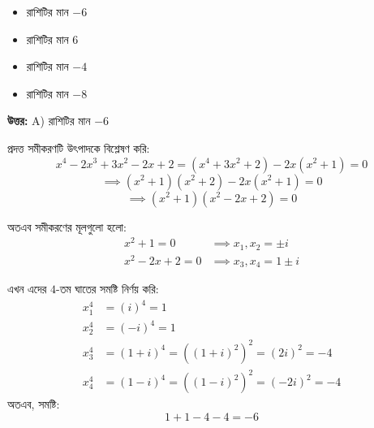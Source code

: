 \documentclass[12pt, a4paper]{article}
\begin{document}
\begin{itemize}[label={}, leftmargin=1cm, itemsep=0.5em]
    \item[\textbf{A)}] রাশিটির মান $-6$
    \item[\textbf{B)}] রাশিটির মান $6$
    \item[\textbf{C)}] রাশিটির মান $-4$
    \item[\textbf{D)}] রাশিটির মান $-8$
\end{itemize}

\vspace{0.5em}
\begin{tcolorbox}[answerbox]
    \textbf{\color{success} উত্তর:} A) রাশিটির মান $-6$
\end{tcolorbox}
\vspace{1em}

\begin{tcolorbox}[solutionbox={সমাধান (Solution)}]
    \noindent
    প্রদত্ত সমীকরণটি উৎপাদকে বিশ্লেষণ করি:
    \[ x^4 - 2x^3 + 3x^2 - 2x + 2 = (x^4 + 3x^2 + 2) - 2x(x^2 + 1) = 0 \]
    \[ \implies (x^2 + 1)(x^2 + 2) - 2x(x^2 + 1) = 0 \]
    \[ \implies (x^2 + 1)(x^2 - 2x + 2) = 0 \]
    
    \vspace{0.5em}
    অতএব সমীকরণের মূলগুলো হলো:
    \begin{align*}
        x^2 + 1 = 0 &\implies x_1, x_2 = \pm i \\
        x^2 - 2x + 2 = 0 &\implies x_3, x_4 = 1 \pm i
    \end{align*}
    
    \vspace{0.5em}
    এখন এদের $4$-তম ঘাতের সমষ্টি নির্ণয় করি:
    \begin{align*}
        x_1^4 &= (i)^4 = 1 \\
        x_2^4 &= (-i)^4 = 1 \\
        x_3^4 &= (1+i)^4 = ((1+i)^2)^2 = (2i)^2 = -4 \\
        x_4^4 &= (1-i)^4 = ((1-i)^2)^2 = (-2i)^2 = -4
    \end{align*}
    অতএব, সমষ্টি:
    \[ 1 + 1 - 4 - 4 = -6 \]
\end{tcolorbox}
\end{document}
